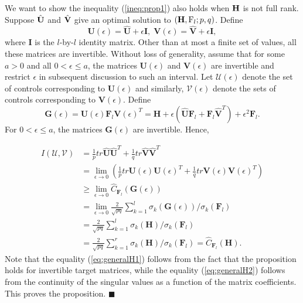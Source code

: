 \documentclass[12pt,onecolumn,draftcls]{IEEEtran}
\begin{document}
We want to show the inequality (\ref{ineq:prop1}) also holds when $\bf H$ is not full rank.
Suppose $\hat{\bf U}$ and $\hat{\bf V}$ give an optimal solution to $({\bf H},{\rm F}_l;p,q)$.
Define
\begin{equation}
\mathbf{U} (\epsilon)=\mathbf{\hat{U}}+\epsilon \mathbf{I}, \;
\mathbf{V} (\epsilon)=\mathbf{\hat{V}}+\epsilon \mathbf{I},
\end{equation}
where $\mathbf{I}$ is the $l$-by-$l$ identity matrix.  Other than at most a finite set of values, all
these matrices are invertible.    Without loss of generality, assume that for some $a>0$ and all $0<\epsilon \leq a$,
the matrices $\mathbf{U}(\epsilon)$ and $\mathbf{V}(\epsilon)$ are invertible
and restrict $\epsilon$ in subsequent discussion to such an interval.   Let
$\mathcal{U}(\epsilon)$ denote the set of controls corresponding to $\mathbf{U}(\epsilon)$
and similarly,  $\mathcal{V}(\epsilon)$ denote the sets of controls corresponding to $\mathbf{V}(\epsilon)$.
Define
\begin{equation}
\mathbf{G}(\epsilon)=\mathbf{U}(\epsilon) \mathbf{F}_l \mathbf{V}(\epsilon)^T=
\mathbf{H}+\epsilon(\mathbf{\hat{U}}\mathbf{F}_l+\mathbf{F}_l \mathbf{\hat{V}}^T)+\epsilon^2 \mathbf{F}_l.
\end{equation}
For $0<\epsilon \leq a$, the matrices $\mathbf{G} (\epsilon)$ are invertible.  Hence,

\begin{align}
I(\mathcal{U},\mathcal{V})  & = \frac{1}{p} tr \mathbf{\hat{U}} \mathbf{\hat{U}}^T +
\frac{1}{q}tr \mathbf{\hat{V}} \mathbf{\hat{V}}^T \\
& = \lim_{\epsilon \rightarrow 0} \left( \frac{1}{p} tr \mathbf{U}(\epsilon) \mathbf{U}(\epsilon)^T +
\frac{1}{q}tr \mathbf{V}(\epsilon) \mathbf{V}(\epsilon)^T \right) \\
& \geq  \lim_{\epsilon \rightarrow 0}\hat{C}_{\mathbf{F}_l}(\mathbf{G}(\epsilon))  \label{eq:john:generalH1}\\
& = \lim_{\epsilon \rightarrow 0} \frac{2}{\sqrt{pq}}
\sum_{k=1}^{l} \sigma_{k}(\mathbf{G}(\epsilon))
/\sigma_k(\mathbf{F}_l) \label{eq:generalH1}\\
&=\frac{2}{\sqrt{pq}}  \sum_{k=1}^{l} \sigma_{k}(\mathbf{H})/\sigma_k(\mathbf{F}_l) \label{eq:generalH2}\\
&=\frac{2}{\sqrt{pq}}  \sum_{k=1}^{r} \sigma_{k}(\mathbf{H})/\sigma_k(\mathbf{F}_l) = \hat{C}_{\mathbf{F}_l}(\mathbf{H}) .
\end{align}
Note that the equality (\ref{eq:generalH1}) follows from the fact that the proposition holds for invertible target matrices, while
the equality (\ref{eq:generalH2}) follows from the continuity of the singular values as a function of
the matrix coefficients.  This proves the proposition.
\hfill $\blacksquare$
\end{document}
